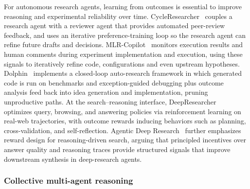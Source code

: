 For autonomous research agents, learning from outcomes is essential to improve reasoning and experimental reliability over time. CycleResearcher~\cite{weng2025cycleresearcherimprovingautomatedresearch} couples a research agent with a reviewer agent that provides automated peer-review feedback, and uses an iterative preference-training loop so the research agent can refine future drafts and decisions. MLR-Copilot~\cite{li2024mlrcopilotautonomousmachinelearning} monitors execution results and human comments during experiment implementation and execution, using these signals to iteratively refine code, configurations and even upstream hypotheses. Dolphin~\cite{yuan2025dolphin} implements a closed-loop auto-research framework in which generated code is run on benchmarks and exception-guided debugging plus outcome analysis feed back into idea generation and implementation, pruning unproductive paths. At the search–reasoning interface, DeepResearcher~\cite{zheng2025deepresearcher} optimizes query, browsing, and answering policies via reinforcement learning on real-web trajectories, with outcome rewards inducing behaviors such as planning, cross-validation, and self-reflection. Agentic Deep Research~\cite{weizhi2025from} further emphasizes reward design for reasoning-driven search, arguing that principled incentives over answer quality and reasoning traces provide structured signals that improve downstream synthesis in deep-research agents.




\subsubsection{Collective multi-agent reasoning}
\label{sec:app-auto-multi-agent}


